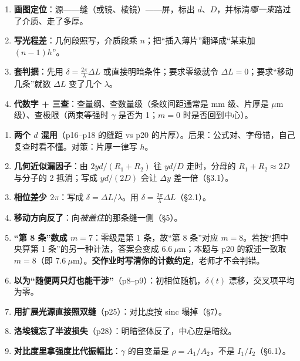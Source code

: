 \documentclass[11pt]{ctexart}
\begin{document}

\begin{enumerate}
\item \textbf{画图定位}：源——缝（或镜、棱镜）——屏，标出 $d$、$D$，并标清\emph{哪一束}路过了介质、走了多厚。
\item \textbf{写光程差}：几何段照写，介质段乘 $n$；把“插入薄片”翻译成“某束加 $(n-1)h$”。
\item \textbf{套判据}：先用 $\delta=\frac{2\pi}{\lambda}\Delta L$ 或直接明暗条件；要求零级就令 $\Delta L=0$；要求“移动几条”就数 $\Delta L$ 变了几个 $\lambda$。
\item \textbf{代数字 + 三查}：查量纲、查数量级（条纹间距通常是 mm 级、片厚是 $\mu$m 级）、查极限（两束等强时 $\gamma$ 是否为 1；$m=0$ 时是否回到中心）。
\end{enumerate}

\flowerrule

\begin{enumerate}
\item \textbf{两个 $d$ 混用}（p16--p18 的缝距 vs p20 的片厚）。后果：公式对、字母错，自己复查时看不懂。对策：片厚一律写 $h$。
\item \textbf{几何近似漏因子}：由 $2yd/(R_1+R_2)$ 往 $yd/D$ 走时，分母的 $R_1+R_2\approx2D$ 与分子的 2 抵消；写成 $yd/(2D)$ 会让 $\Delta y$ 差一倍（\S3.1）。
\item \textbf{相位差少 $2\pi$}：写成 $\delta=\Delta L/\lambda$。用 $\delta=\frac{2\pi}{\lambda}\Delta L$（\S2.1）。
\item \textbf{移动方向反了}：向\emph{被盖住}的那条缝一侧（\S5）。
\item \textbf{“第 8 条”数成 $m=7$}：零级是第 1 条，故“第 8 条”对应 $m=8$。若按“把中央算第 1 条”的另一种计法，答案会变成 $6.6\ \mu$m；本题与 p20 的叙述一致取 $m=8$（即 $7.6\ \mu$m）。\textbf{交作业时写清你的计数约定}，老师才不会判错。
\item \textbf{以为“随便两只灯也能干涉”}（p8--p9）：初相位随机，$\delta(t)$ 漂移，交叉项平均为零。
\item \textbf{用扩展光源直接照双缝}（p25）：对比度按 sinc 塌掉（\S7）。
\item \textbf{洛埃镜忘了半波损失}（p28）：明暗整体反了，中心应是暗纹。
\item \textbf{对比度里拿强度比代振幅比}：$\gamma$ 的自变量是 $\rho=A_1/A_2$，不是 $I_1/I_2$（\S6.1）。
\end{enumerate}
\end{document}
